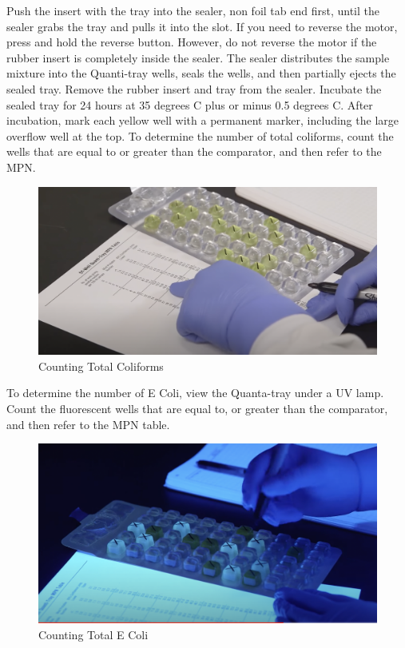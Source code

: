 \documentclass[12pt]{../SOP4_alpha}\usepackage[]{graphicx}\usepackage[]{xcolor}
\begin{document}
\NP Push the insert with the tray into the sealer, non foil tab end first, until the sealer grabs the tray and pulls it into the slot. If you need to reverse the motor, press and hold the reverse button. However, do not reverse the motor if the rubber insert is completely inside the sealer.
The sealer distributes the sample mixture into the Quanti-tray wells, seals the wells, and then partially ejects the sealed tray.
\NP Remove the rubber insert and tray from the sealer.
\NP Incubate the sealed tray for 24 hours at 35 degrees C plus or minus 0.5 degrees C.
\NP After incubation, mark each yellow well with a permanent marker, including the large overflow well at the top. To determine the number of total coliforms, count the wells that are equal to or greater than the comparator, and then refer to the MPN.
\begin{figure}[h!]
\includegraphics[scale=0.3]{ColiformCount.png}
\caption{Counting Total Coliforms}
\label{fig:Counting Total Coliforms}
\end{figure}

\NP To determine the number of E Coli, view the Quanta-tray under a UV lamp. Count the fluorescent wells that are equal to, or greater than the comparator, and then refer to the MPN table.
\begin{figure}[h!]
\includegraphics[scale=0.3]{EcoliCount.png}
\caption{Counting Total E Coli}
\label{fig:Counting Total E Coli}
\end{figure}
\end{document}
